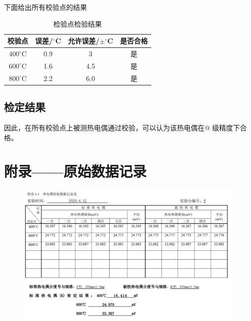\documentclass[UTF8]{article}
\makeatletter
\newcommand{\Rmnum}[1]{\expandafter\@slowromancap\romannumeral #1@}
\makeatother
\begin{document}
	下面给出所有校验点的结果
	\begin{table}[H]
		\centering
		\caption{检验点检验结果}
	\begin{tabular}{cccc}
		\toprule
		校验点&误差/$^\circ$C  & 允许误差/$\pm ^\circ$C & 是否合格 \\ 
		\midrule
		$400^\circ$C&0.9  &3  &是  \\ 
		$600^\circ$C& 1.6 &4.5  &是  \\ 
		$800^\circ$C&  2.2& 6.0 & 是 \\ 
		\bottomrule
	\end{tabular}
	\end{table}

\subsection{检定结果}
	因此，在所有校验点上被测热电偶通过校验，可以认为该热电偶在\Rmnum2 级精度下合格。
	
	\section{附录——原始数据记录}
	\begin{figure}[H]
		\centering
		\includegraphics[width=\linewidth]{figure/origin}
		\label{fig:origin}
	\end{figure}
	
\end{document}
